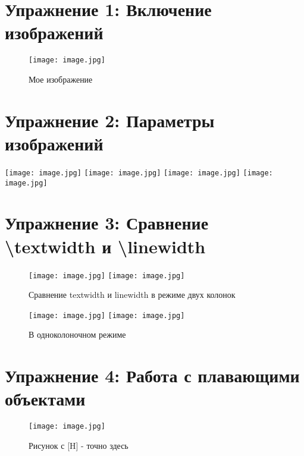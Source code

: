 \documentclass{article}
\begin{document}
\section*{Упражнение 1: Включение изображений}
\begin{figure}[H]
\centering
\texttt{[image: image.jpg]}
\caption{Мое изображение}
\label{fig:myimage}
\end{figure}



\section*{Упражнение 2: Параметры изображений}

\begin{center}
\texttt{[image: image.jpg]}
\texttt{[image: image.jpg]}
\texttt{[image: image.jpg]}
\texttt{[image: image.jpg]}
\end{center}


\clearpage
\twocolumn

\section*{Упражнение 3: Сравнение \textbackslash textwidth и \textbackslash linewidth}

\begin{figure}[h!]
\centering
\texttt{[image: image.jpg]}
\texttt{[image: image.jpg]}
\caption{Сравнение textwidth и linewidth в режиме двух колонок}
\end{figure}

\onecolumn
\clearpage


\begin{figure}[h!]
\centering
\texttt{[image: image.jpg]}
\texttt{[image: image.jpg]}
\caption{В одноколоночном режиме}
\end{figure}






\newpage


\section*{Упражнение 4: Работа с плавающими объектами}

\lipsum[1-2]

\begin{figure}[H]
\centering
\texttt{[image: image.jpg]}
\caption{Рисунок с [H] - точно здесь}
\label{fig:here}
\end{figure}
\end{document}
